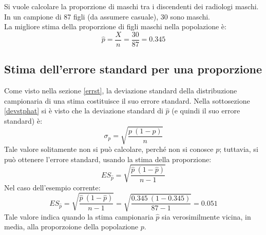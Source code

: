 \documentclass[10pt, draft]{book}
\newcounter{example}[section]
\begin{document}
\begin{example}
    Si vuole calcolare la proporzione di maschi tra i discendenti dei radiologi maschi.
    \\
    In un campione di 87 figli (da assumere casuale), 30 sono maschi.
    \\
    La migliore stima della proporzione di figli maschi nella popolazione è:
    \begin{equation}
    \hat{p} = \frac{X}{n} = \frac{30}{87} = 0.345
    \end{equation}

    \subsection{Stima dell'errore standard per una proporzione}
    Come visto nella sezione \ref{errst}, la deviazione standard della distribuzione campionaria di una stima costituisce il suo errore standard. Nella sottosezione \ref{devstphat} si è visto che la deviazione standard di $\hat{p}$ (e quindi il suo errore standard) è:
    \begin{equation}
    \sigma_{\hat{p}} = \sqrt{\frac{p \ (1-p)}{n}}
    \end{equation}
    Tale valore solitamente non si può calcolare, perché non si conosce $p$; tuttavia, si può ottenere l'errore standard, usando la stima della proporzione:
    \begin{equation}
    ES_{\hat{p}} = \sqrt{\frac{\hat{p} \ (1-\hat{p})}{n-1}}
    \end{equation}
    Nel caso dell'esempio corrente:
    \begin{equation}
    ES_{\hat{p}} = \sqrt{\frac{\hat{p} \ (1-\hat{p})}{n-1}} = \sqrt{\frac{0.345 \ (1-0.345)}{87-1}} = 0.051
    \end{equation}
    Tale valore indica quando la stima campionaria $\hat{p}$ sia verosimilmente vicina, in media, alla proporzoione della popolazione $p$.


\end{example}
\end{document}
